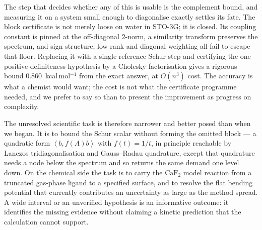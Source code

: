 \documentclass[11pt,a4paper]{article}
\theoremstyle{plain}
\theoremstyle{definition}
\theoremstyle{remark}
\newcommand{\ip}[2]{\left\langle #1,#2\right\rangle}
\begin{document}
The step that decides whether any of this is usable is the complement bound, and
measuring it on a system small enough to diagonalise exactly settles its fate. The
block certificate is not merely loose on water in STO-3G; it is closed. Its
coupling constant is pinned at the off-diagonal $2$-norm, a similarity transform
preserves the spectrum, and sign structure, low rank and diagonal weighting all
fail to escape that floor. Replacing it with a single-reference Schur step and
certifying the one positive-definiteness hypothesis by a Cholesky factorisation
gives a rigorous bound $0.860$~kcal\,mol$^{-1}$ from the exact answer, at $O(n^3)$
cost. The accuracy is what a chemist would want; the cost is not what the
certificate programme needed, and we prefer to say so than to present the
improvement as progress on complexity.

The unresolved scientific task is therefore narrower and better posed than when we
began. It is to bound the Schur scalar without forming the omitted block --- a
quadratic form $\ip{b}{f(A)b}$ with $f(t)=1/t$, in principle reachable by Lanczos
tridiagonalisation and Gauss--Radau quadrature, except that quadrature needs a node
below the spectrum and so returns the same demand one level down. On the chemical
side the task is to carry the $\mathrm{CaF_2}$ model reaction from a truncated
gas-phase ligand to a specified surface, and to resolve the flat bending potential
that currently contributes an uncertainty as large as the method spread. A wide
interval or an unverified hypothesis is an informative outcome: it identifies the
missing evidence without claiming a kinetic prediction that the calculation cannot
support.



\end{document}
